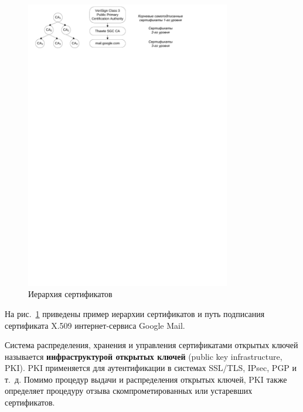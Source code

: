 \begin{figure}[!ht]
	\centering
	\includegraphics[width=0.8\textwidth]{pic/X509-hierarchy}
	\caption{Иерархия сертификатов\label{fig:x509-hierarchy}}
\end{figure}

На рис.~\ref{fig:x509-hierarchy} приведены пример иерархии сертификатов и путь подписания сертификата X.509 интернет-сервиса Google Mail.

Система распределения, хранения и управления сертификатами открытых ключей называется \textbf{инфраструктурой открытых ключей} (public key infrastructure, PKI). PKI применяется для аутентификации в системах SSL/TLS, IPsec, PGP и т.~д. Помимо процедур выдачи и распределения открытых ключей, PKI также определяет процедуру отзыва скомпрометированных или устаревших сертификатов.
